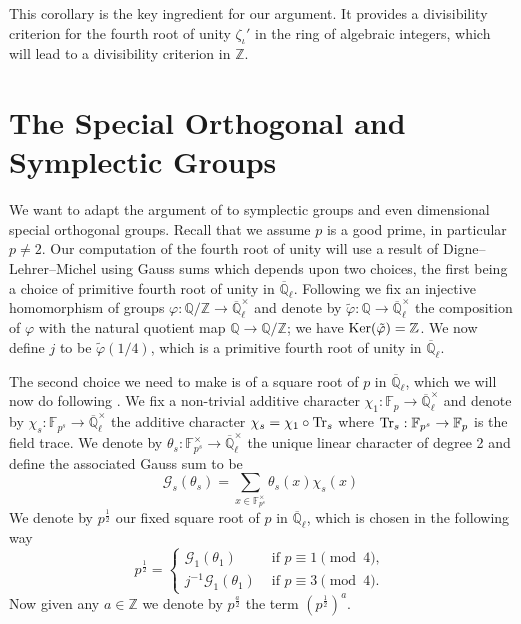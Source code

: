 \documentclass{jt-calcs}
\begin{document}
This corollary is the key ingredient for our argument. It provides a divisibility criterion for the fourth root of unity $\zeta_{\iota}'$ in the ring of algebraic integers, which will lead to a divisibility criterion in $\mathbb{Z}$.

\section{The Special Orthogonal and Symplectic Groups}\label{sec:orth-symp-groups}
We want to adapt the argument of \cite[Theorem 3.8]{geck:1999:character-sheaves-and-GGGRs} to symplectic groups and even dimensional special orthogonal groups. Recall that we assume $p$ is a good prime, in particular $p \neq 2$. Our computation of the fourth root of unity will use a result of Digne--Lehrer--Michel using Gauss sums which depends upon two choices, the first being a choice of primitive fourth root of unity in $\overline{\mathbb{Q}}_{\ell}$. Following \cite[\S 1.B]{bonnafe:2006:sln} we fix an injective homomorphism of groups $\varphi : \mathbb{Q/Z} \to \overline{\mathbb{Q}}_{\ell}^{\times}$ and denote by $\tilde{\varphi} : \mathbb{Q} \to \overline{\mathbb{Q}}_{\ell}^{\times}$ the composition of $\varphi$ with the natural quotient map $\mathbb{Q} \to \mathbb{Q/Z}$; we have $\operatorname{Ker}(\tilde{\varphi}) = \mathbb{Z}$. We now define $j$ to be $\tilde{\varphi}(1/4)$, which is a primitive fourth root of unity in $\overline{\mathbb{Q}}_{\ell}$.

The second choice we need to make is of a square root of $p$ in $\overline{\mathbb{Q}}_{\ell}$, which we will now do following \cite[\S 36]{bonnafe:2006:sln}. We fix a non-trivial additive character $\chi_1 : \mathbb{F}_p \to \overline{\mathbb{Q}}_{\ell}^{\times}$ and denote by $\chi_s : \mathbb{F}_{p^s} \to \overline{\mathbb{Q}}_{\ell}^{\times}$ the additive character $\chi_s = \chi_1 \circ \operatorname{Tr}_s$ where $\operatorname{Tr}_s : \mathbb{F}_{p^s} \to \mathbb{F}_p$ is the field trace. We denote by $\theta_s : \mathbb{F}_{p^s}^{\times} \to \overline{\mathbb{Q}}_{\ell}^{\times}$ the unique linear character of degree 2 and define the associated Gauss sum to be
\begin{equation*}
\mathcal{G}_s(\theta_s) = \sum_{x \in \mathbb{F}_{p^s}^{\times}} \theta_s(x)\chi_s(x)
\end{equation*}
We denote by $p^{\frac{1}{2}}$ our fixed square root of $p$ in $\overline{\mathbb{Q}}_{\ell}$, which is chosen in the following way
\begin{equation*}
p^{\frac{1}{2}} = \begin{cases}
\mathcal{G}_1(\theta_1) &\text{ if }p\equiv 1 \pmod{4},\\
j^{-1}\mathcal{G}_1(\theta_1) &\text{ if }p\equiv 3 \pmod{4}.
\end{cases}
\end{equation*}
Now given any $a \in \mathbb{Z}$ we denote by $p^{\frac{a}{2}}$ the term $(p^{\frac{1}{2}})^a$.
\end{document}
